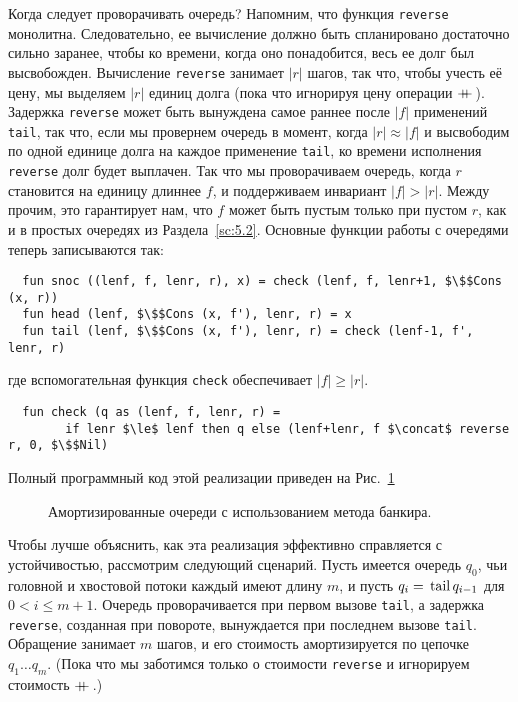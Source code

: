 Когда следует проворачивать очередь? Напомним, что функция
\lstinline!reverse! монолитна. Следовательно, ее вычисление должно
быть спланировано достаточно сильно заранее, чтобы ко времени, когда
оно понадобится, весь ее долг был высвобожден. Вычисление
\lstinline!reverse! занимает $|r|$ шагов, так что, чтобы учесть её
цену, мы выделяем $|r|$ единиц долга (пока что игнорируя цену
операции $+\!\!\!+\,$). Задержка \lstinline!reverse! может быть вынуждена
самое раннее после $|f|$ применений \lstinline!tail!, так что, если мы
провернем очередь в момент, когда $|r| \approx |f|$ и высвободим по
одной единице долга на каждое применение \lstinline!tail!, ко времени
исполнения \lstinline!reverse! долг будет выплачен.  Так что мы
проворачиваем очередь, когда $r$ становится на единицу длиннее $f$, и
поддерживаем инвариант $|f| > |r|$. Между прочим, это гарантирует нам,
что $f$ может быть пустым только при пустом $r$, как и в простых
очередях из Раздела~\ref{sc:5.2}. Основные функции работы с очередями
теперь записываются так:
\begin{lstlisting}
  fun snoc ((lenf, f, lenr, r), x) = check (lenf, f, lenr+1, $\$$Cons (x, r))
  fun head (lenf, $\$$Cons (x, f'), lenr, r) = x
  fun tail (lenf, $\$$Cons (x, f'), lenr, r) = check (lenf-1, f', lenr, r)
\end{lstlisting}
где вспомогательная функция \lstinline!check! обеспечивает $|f| \ge |r|$.
\begin{lstlisting}
  fun check (q as (lenf, f, lenr, r) =
        if lenr $\le$ lenf then q else (lenf+lenr, f $\concat$ reverse r, 0, $\$$Nil)
\end{lstlisting}
Полный программный код этой реализации приведен на Рис.~\ref{fig:6.1}
\begin{figure}
  \centering
  
  \caption{Амортизированные очереди с использованием метода банкира.}
  \label{fig:6.1}
\end{figure}

Чтобы лучше объяснить, как эта реализация эффективно справляется с
устойчивостью, рассмотрим следующий сценарий. Пусть имеется очередь
$q_0$, чьи головной и хвостовой потоки каждый имеют длину $m$, и пусть
$q_i = \lstinline!tail! q_{i-1}$ для $0 < i \le m+1$. Очередь
проворачивается при первом вызове \lstinline!tail!, а задержка
\lstinline!reverse!, созданная при повороте, вынуждается при последнем
вызове \lstinline!tail!. Обращение занимает $m$ шагов, и его стоимость
амортизируется по цепочке $q_1\ldots q_m$. (Пока что мы заботимся
только о стоимости \lstinline!reverse! и игнорируем стоимость
$+\!\!\!+\,$.)

